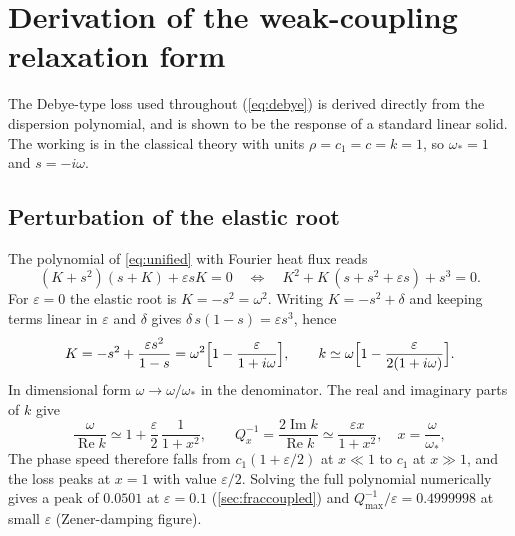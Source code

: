 \section{Derivation of the weak-coupling relaxation form}\label{app:debye}

The Debye-type loss used throughout (\cref{eq:debye}) is derived directly from the dispersion polynomial, and is shown to be the response of a standard linear solid. The working is in the classical theory with units $\rho=c_1=c=k=1$, so $\omega_*=1$ and $s=-i\omega$.

\subsection{Perturbation of the elastic root}
The polynomial of \cref{eq:unified} with Fourier heat flux reads
\begin{equation}
(K+s^2)(s+K)+\varepsilon sK=0\quad\Longleftrightarrow\quad K^2+K\,(s+s^2+\varepsilon s)+s^3=0 .
\end{equation}
For $\varepsilon=0$ the elastic root is $K=-s^2=\omega^2$. Writing $K=-s^2+\delta$ and keeping terms linear in $\varepsilon$ and $\delta$ gives $\delta\,s(1-s)=\varepsilon s^3$, hence
\begin{equation}
K=-s^2+\frac{\varepsilon s^2}{1-s}=\omega^2\Bigl[1-\frac{\varepsilon}{1+i\omega}\Bigr],\qquad
k\simeq\omega\Bigl[1-\frac{\varepsilon}{2(1+i\omega)}\Bigr].
\end{equation}
In dimensional form $\omega\to\omega/\omega_*$ in the denominator. The real and imaginary parts of $k$ give
\begin{equation}
\frac{\omega}{\operatorname{Re}k}\simeq1+\frac{\varepsilon}{2}\,\frac{1}{1+x^2},\qquad
Q_x^{-1}=\frac{2\operatorname{Im}k}{\operatorname{Re}k}\simeq\frac{\varepsilon x}{1+x^2},\quad x=\frac{\omega}{\omega_*},
\end{equation}
The phase speed therefore falls from $c_1(1+\varepsilon/2)$ at $x\ll1$ to $c_1$ at $x\gg1$, and the loss peaks at $x=1$ with value $\varepsilon/2$. Solving the full polynomial numerically gives a peak of $0.0501$ at $\varepsilon=0.1$ (\cref{sec:fraccoupled}) and $Q^{-1}_{\max}/\varepsilon=0.4999998$ at small $\varepsilon$ (Zener-damping figure).

